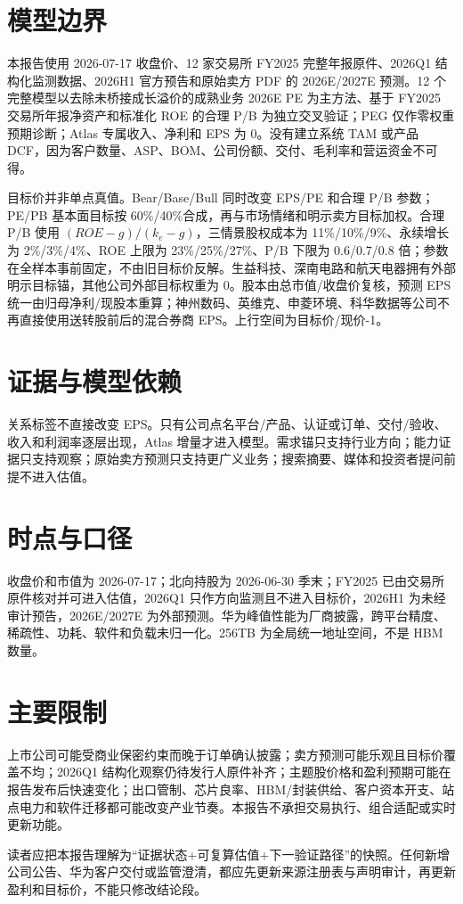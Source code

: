 \section{模型边界}

本报告使用 2026-07-17 收盘价、12 家交易所 FY2025 完整年报原件、2026Q1 结构化监测数据、2026H1 官方预告和原始卖方 PDF 的 2026E/2027E 预测。12 个完整模型以去除未桥接成长溢价的成熟业务 2026E PE 为主方法、基于 FY2025 交易所年报净资产和标准化 ROE 的合理 P/B 为独立交叉验证；PEG 仅作零权重预期诊断；Atlas 专属收入、净利和 EPS 为 0。没有建立系统 TAM 或产品 DCF，因为客户数量、ASP、BOM、公司份额、交付、毛利率和营运资金不可得。

目标价并非单点真值。Bear/Base/Bull 同时改变 EPS/PE 和合理 P/B 参数；PE/P\!B 基本面目标按 60\%/40\%合成，再与市场情绪和明示卖方目标加权。合理 P/B 使用 $(ROE-g)/(k_e-g)$，三情景股权成本为 11\%/10\%/9\%、永续增长为 2\%/3\%/4\%、ROE 上限为 23\%/25\%/27\%、P/B 下限为 0.6/0.7/0.8 倍；参数在全样本事前固定，不由旧目标价反解。生益科技、深南电路和航天电器拥有外部明示目标锚，其他公司外部目标权重为 0。股本由总市值/收盘价复核，预测 EPS 统一由归母净利/现股本重算；神州数码、英维克、申菱环境、科华数据等公司不再直接使用送转股前后的混合券商 EPS。上行空间为目标价/现价-1。

\section{证据与模型依赖}

关系标签不直接改变 EPS。只有公司点名平台/产品、认证或订单、交付/验收、收入和利润率逐层出现，Atlas 增量才进入模型。需求锚只支持行业方向；能力证据只支持观察；原始卖方预测只支持更广义业务；搜索摘要、媒体和投资者提问前提不进入估值。

\section{时点与口径}

收盘价和市值为 2026-07-17；北向持股为 2026-06-30 季末；FY2025 已由交易所原件核对并可进入估值，2026Q1 只作方向监测且不进入目标价，2026H1 为未经审计预告，2026E/2027E 为外部预测。华为峰值性能为厂商披露，跨平台精度、稀疏性、功耗、软件和负载未归一化。256TB 为全局统一地址空间，不是 HBM 数量。

\section{主要限制}

上市公司可能受商业保密约束而晚于订单确认披露；卖方预测可能乐观且目标价覆盖不均；2026Q1 结构化观察仍待发行人原件补齐；主题股价格和盈利预期可能在报告发布后快速变化；出口管制、芯片良率、HBM/封装供给、客户资本开支、站点电力和软件迁移都可能改变产业节奏。本报告不承担交易执行、组合适配或实时更新功能。

\begin{disclosurebox}[研究使用说明]
读者应把本报告理解为“证据状态+可复算估值+下一验证路径”的快照。任何新增公司公告、华为客户交付或监管澄清，都应先更新来源注册表与声明审计，再更新盈利和目标价，不能只修改结论段。
\end{disclosurebox}
